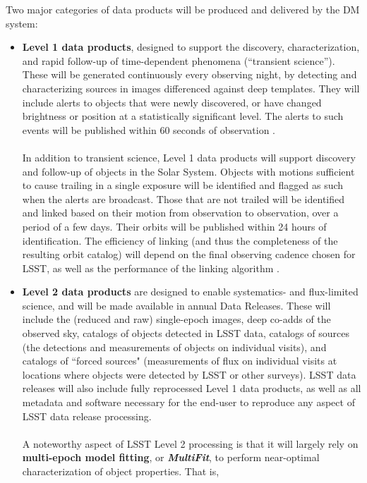 \documentclass[11pt,twoside]{article}
\begin{document}
Two major categories of data products will be produced and delivered by the DM
system:
\begin{itemize}
\item {\bf Level 1 data products}, designed to support the discovery,
  characterization, and rapid follow-up of time-dependent phenomena
  (``transient science''). These will be generated continuously every
  observing night, by detecting and characterizing sources in images
  differenced against deep templates. They will include alerts to
  objects that were newly discovered, or have changed brightness or
  position at a statistically significant level. The alerts to such
  events will be published within 60   seconds of observation
  \citep[see e.g.][for details]{2014htu..conf...19K}.\\
\\
In addition to transient science, Level 1 data products will support
discovery and follow-up of objects in the Solar System. Objects with
motions sufficient to cause trailing in a single exposure will be
identified and flagged as such when the alerts are broadcast. Those
that are not trailed will be identified and linked based on their
motion from observation to observation, over a period of a few
days. Their orbits will be published within 24 hours of
identification. The efficiency of linking (and thus the completeness
of the resulting orbit catalog) will depend on the final observing
cadence chosen for LSST, as well as the performance of the linking
algorithm \citep{LDM-156, 2015arXiv151103199J}.
\item {\bf Level 2 data products} are designed to enable systematics- and flux-limited science, and will be made available in annual Data Releases. These will include the (reduced and raw) single-epoch images, deep co-adds of the observed sky, catalogs of objects detected in LSST data, catalogs of sources (the detections and measurements of objects on individual visits), and catalogs of ``forced sources" (measurements of flux on individual visits at locations where objects were detected by LSST or other surveys). LSST data releases will also include fully reprocessed Level 1 data products, as well as all metadata and software necessary for the end-user to reproduce any aspect of LSST data release processing.\\
\\
A noteworthy aspect of LSST Level 2 processing is that it will largely
rely on {\bf multi-epoch model fitting}, or {\bf \em MultiFit}, to
perform near-optimal characterization of object properties. That is,

\end{itemize}
\end{document}
